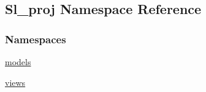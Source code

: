 \hypertarget{namespaceSl__proj}{}\subsection{Sl\+\_\+proj Namespace Reference}
\label{namespaceSl__proj}
\subsubsection*{Namespaces}
\begin{DoxyCompactItemize}
\item 
 \hyperlink{namespaceSl__proj_1_1models}{models}
\item 
 \hyperlink{namespaceSl__proj_1_1views}{views}
\end{DoxyCompactItemize}
